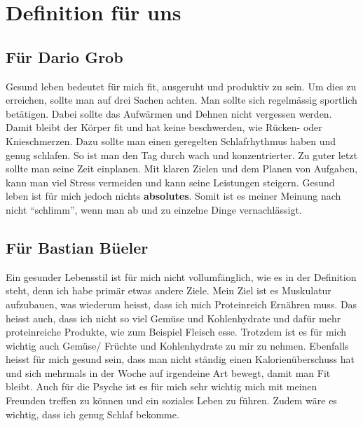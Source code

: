 \section{Definition für uns}
\subsection{Für Dario Grob}
Gesund leben bedeutet für mich fit, ausgeruht und produktiv zu sein.
\newline
Um dies zu erreichen, sollte man auf drei Sachen achten. 
\newline
Man sollte sich regelmässig sportlich betätigen. Dabei sollte das Aufwärmen und Dehnen nicht vergessen werden. Damit bleibt der Körper fit und hat keine  beschwerden, wie Rücken- oder Knieschmerzen.
\newline
Dazu sollte man einen geregelten Schlafrhythmus haben und genug schlafen. So ist man den Tag durch wach und konzentrierter.
\newline
Zu guter letzt sollte man seine Zeit einplanen. Mit klaren Zielen und dem Planen von Aufgaben, kann man viel Stress vermeiden und kann seine Leistungen steigern.
\newline
Gesund leben ist für mich jedoch nichts \textbf{absolutes}. Somit ist es meiner Meinung nach nicht “schlimm”, wenn man ab und zu einzelne Dinge vernachlässigt.
\subsection{Für Bastian Büeler}
Ein gesunder Lebensstil ist für mich nicht vollumfänglich, wie es in der Definition steht, denn ich habe primär etwas andere Ziele. Mein Ziel ist es Muskulatur aufzubauen, was wiederum heisst, dass ich mich Proteinreich Ernähren muss. Das heisst auch, dass ich nicht so viel Gemüse und Kohlenhydrate und dafür mehr proteinreiche Produkte, wie zum Beispiel Fleisch esse. Trotzdem ist es für mich wichtig auch Gemüse/ Früchte und Kohlenhydrate zu mir zu nehmen. Ebenfalls heisst für mich gesund sein, dass man nicht ständig einen Kalorienüberschuss hat und sich mehrmals in der Woche auf irgendeine Art bewegt, damit man Fit bleibt. Auch für die Psyche ist es für mich sehr wichtig mich mit meinen Freunden treffen zu können und ein soziales Leben zu führen. Zudem wäre es wichtig, dass ich genug Schlaf bekomme.
